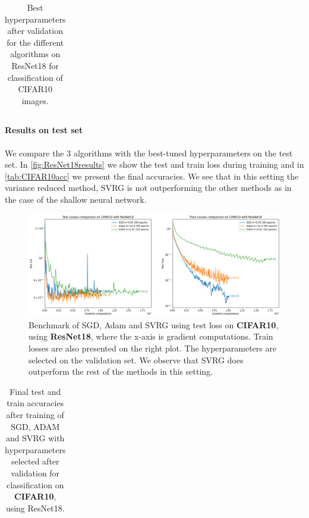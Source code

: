 \documentclass[a4paper,11pt,oneside]{report}
\begin{document}
\begin{table}
    \begin{center}
        \begin{tabular}{||c | c | l||}
             \hline
             
        \end{tabular}
    \end{center}
    \caption{Best hyperparameters after validation for the different algorithms on ResNet18 for classification of CIFAR10 images.
    }
    \label{tbl:BestHyperparametersCIFAR}
\end{table}

\paragraph{Results on test set}
We compare the 3 algorithms with the best-tuned hyperparameters on the test set. In \autoref{fig:ResNet18results} we show the test and train loss during training and in \autoref{tab:CIFAR10acc} we present the final accuracies. 
We see that in this setting the variance reduced method, SVRG is not outperforming the other methods as in the case of the shallow neural network. 

\begin{figure}
    \centering
    \includegraphics[width=\columnwidth]{report/figures/CIFAR10.png}
    \caption{Benchmark of SGD, Adam and SVRG using test loss on \textbf{CIFAR10}, using \textbf{ResNet18}, where the x-axis is gradient computations. Train losses are also presented on the right plot. The hyperparameters are selected on the validation set. We observe that SVRG does outperform the rest of the methods in this setting.}
    \label{fig:ResNet18results}
\end{figure}

\begin{table}[h]
    \begin{center}
        \begin{tabular}{||c | c | c||}
             \hline
             
        \end{tabular}
    \end{center}
    \caption{Final test and train accuracies after training of SGD, ADAM and SVRG with hyperparameters selected after validation for classification on \textbf{CIFAR10}, using ResNet18.}
    \label{tab:CIFAR10acc}
\end{table}
\end{document}
